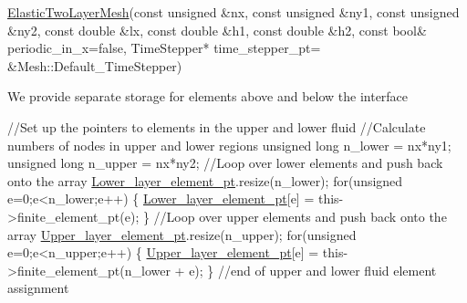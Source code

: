 \begin{DoxyCodeInclude}
 \hyperlink{classElasticTwoLayerMesh_a720be7cd7b0f44df04dcb0d09a2795a7}{ElasticTwoLayerMesh}(\textcolor{keyword}{const} \textcolor{keywordtype}{unsigned} &nx, 
                     \textcolor{keyword}{const} \textcolor{keywordtype}{unsigned} &ny1,
                     \textcolor{keyword}{const} \textcolor{keywordtype}{unsigned} &ny2, 
                     \textcolor{keyword}{const} \textcolor{keywordtype}{double} &lx,
                     \textcolor{keyword}{const} \textcolor{keywordtype}{double} &h1,
                     \textcolor{keyword}{const} \textcolor{keywordtype}{double} &h2,
                     \textcolor{keyword}{const} \textcolor{keywordtype}{bool}& periodic\_in\_x=\textcolor{keyword}{false},
                     TimeStepper* time\_stepper\_pt=
                     &Mesh::Default\_TimeStepper)

\end{DoxyCodeInclude}


We provide separate storage for elements above and below the interface


\begin{DoxyCodeInclude}
   \textcolor{comment}{//Set up the pointers to elements in the upper and lower fluid}
   \textcolor{comment}{//Calculate numbers of nodes in upper and lower regions}
   \textcolor{keywordtype}{unsigned} \textcolor{keywordtype}{long} n\_lower = nx*ny1;
   \textcolor{keywordtype}{unsigned} \textcolor{keywordtype}{long} n\_upper = nx*ny2;
   \textcolor{comment}{//Loop over lower elements and push back onto the array}
   \hyperlink{classElasticTwoLayerMesh_a4f8c33eaaa185e8c8710883ee9b5811f}{Lower\_layer\_element\_pt}.resize(n\_lower);
   \textcolor{keywordflow}{for}(\textcolor{keywordtype}{unsigned} e=0;e<n\_lower;e++)
    \{
     \hyperlink{classElasticTwoLayerMesh_a4f8c33eaaa185e8c8710883ee9b5811f}{Lower\_layer\_element\_pt}[e] = this->finite\_element\_pt(e);
    \}
   \textcolor{comment}{//Loop over upper elements and push back onto the array}
   \hyperlink{classElasticTwoLayerMesh_ae46d4ef2bb95a6c023bd0dc1e367ccfb}{Upper\_layer\_element\_pt}.resize(n\_upper);
   \textcolor{keywordflow}{for}(\textcolor{keywordtype}{unsigned} e=0;e<n\_upper;e++)
    \{
     \hyperlink{classElasticTwoLayerMesh_ae46d4ef2bb95a6c023bd0dc1e367ccfb}{Upper\_layer\_element\_pt}[e] =  this->finite\_element\_pt(n\_lower + e);
    \}
   \textcolor{comment}{//end of upper and lower fluid element assignment}

\end{DoxyCodeInclude}


